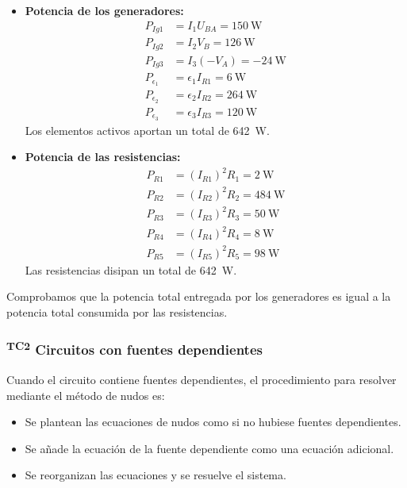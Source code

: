 \begin{example}
          \begin{itemize}
          \item \textbf{Potencia de los generadores:}
            \begin{align*}
              P_{Ig1} &= I_1 U_{BA} = \qty{150}{\watt}\\
              P_{Ig2} &= I_2 V_{B} = \qty{126}{\watt}\\
              P_{Ig3} &= I_3 (-V_{A}) = - \qty{24}{\watt}\\
              P_{\epsilon_1} &= \epsilon_1 I_{R1} = \qty{6}{\watt}\\
              P_{\epsilon_2} &= \epsilon_2 I_{R2} = \qty{264}{\watt}\\
              P_{\epsilon_3} &= \epsilon_3 I_{R3} = \qty{120}{\watt}
            \end{align*}
            Los elementos activos aportan un total de
            \qty{642}{\watt}.
          \item \textbf{Potencia de las resistencias:}
            \begin{align*}
              P_{R1} &= (I_{R1})^2 R_1 = \qty{2}{\watt}\\
              P_{R2} &= (I_{R2})^2 R_2 = \qty{484}{\watt}\\
              P_{R3} &= (I_{R3})^2 R_3 = \qty{50}{\watt}\\
              P_{R4} &= (I_{R4})^2 R_4 = \qty{8}{\watt}\\
              P_{R5} &= (I_{R5})^2 R_5 = \qty{98}{\watt}
            \end{align*}
            Las resistencias disipan un total de \SI{642}{\watt}.
          \end{itemize}

          Comprobamos que la potencia total entregada por los
          generadores es igual a la potencia total consumida por las
          resistencias.

        \end{example}
	
        \subsubsection{\textsuperscript{TC2} Circuitos con fuentes
          dependientes}
        \label{sec:nudos-fuentes-dependientes}

        Cuando el circuito contiene fuentes dependientes, el
        procedimiento para resolver mediante el método de nudos es:
        \begin{itemize}
        \item Se plantean las ecuaciones de nudos como si no hubiese
          fuentes dependientes.
        \item Se añade la ecuación de la fuente dependiente como una
          ecuación adicional.
        \item Se reorganizan las ecuaciones y se resuelve el sistema.
        \end{itemize}

